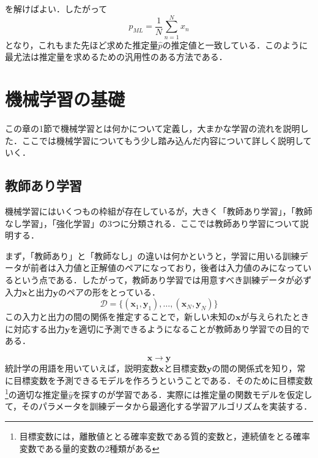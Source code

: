 \documentclass[a4paper,11pt]{jsreport}
\begin{document}
を解けばよい．したがって
\begin{equation}
  p_{ML} = \frac{1}{N} \sum_{n=1}^{N} x_n
\end{equation}
となり，これもまた先ほど求めた推定量$\hat{p}$の推定値と一致している．このように最尤法は推定量を求めるための汎用性のある方法である．

\section{機械学習の基礎}
この章の1節で機械学習とは何かについて定義し，大まかな学習の流れを説明した．ここでは機械学習についてもう少し踏み込んだ内容について詳しく説明していく．

\subsection{教師あり学習}
機械学習にはいくつもの枠組が存在しているが，大きく「教師あり学習」，「教師なし学習」，「強化学習」の3つに分類される．ここでは教師あり学習について説明する．\par
まず，「教師あり」と「教師なし」の違いは何かというと，学習に用いる訓練データが前者は入力値と正解値のペアになっており，後者は入力値のみになっているという点である．したがって，教師あり学習では用意すべき訓練データが必ず入力$\bm{x}$と出力$\bm{y}$のペアの形をとっている．
\begin{equation}
  \mathcal{D} 
  = \{ (\bm{x}_1, \bm{y}_1), \dots, (\bm{x}_N, \bm{y}_N) \}  
\end{equation}
この入力と出力の間の関係を推定することで，新しい未知の$\bm{x}$が与えられたときに対応する出力$\bm{y}$を適切に予測できるようになることが教師あり学習での目的である．\par
\begin{equation}
  \bm{x} \longrightarrow \bm{y}
\end{equation}
統計学の用語を用いていえば，説明変数$\mathbf{x}$と目標変数$\mathbf{y}$の間の関係式を知り，常に目標変数を予測できるモデルを作ろうということである．そのために目標変数\footnote{目標変数には，離散値ととる確率変数である質的変数と，連続値をとる確率変数である量的変数の2種類がある}の適切な推定量$\hat{y}$を探すのが学習である．実際には推定量の関数モデルを仮定して，そのパラメータを訓練データから最適化する学習アルゴリズムを実装する．
\end{document}
